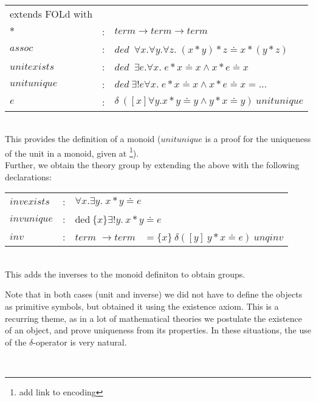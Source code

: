 \documentclass{article}
\begin{document}
\begin{example}\ \\
\begin{tabular}{p{3.3cm}p{0.2cm}p{8cm}}\\
extends FOLd with& &  \\
$\ast$ & : & $term \rightarrow term \rightarrow term $\\
$assoc$ & : & $ded$\ $\forall x. \forall y. \forall z.\; (x\ast y)\ast z\doteq x\ast (y \ast z)$\\
$unitexists$ & : & $ded$\   $\exists e.\forall x.\; e\ast x \doteq x \wedge x\ast e\doteq x$ \\
$unitunique$ & : & $ded\ \exists! e \forall x.\; e\ast x \doteq x \wedge x\ast e\doteq x =  \dots$\\
$e$ & : & $\delta\ ([x]\forall y. x\ast y \doteq y \wedge y\ast x\doteq y)\ unitunique$\\

\end{tabular}\\
This provides the definition of a monoid ($unitunique$ is a proof for the uniqueness of the unit in a monoid, given at \footnote{add link to encoding}).\\

Further, we obtain the theory group by extending the above with the following declarations:\\
\begin{tabular}{ p{3cm}p{0.2cm}p{8cm}} 
$invexists$ & : & $\forall x.\exists y .\; x\ast y \doteq e$ \\
$invunique$ & : &  ded$\ \{x\} \exists! y.\ x\ast y \doteq e$\\
$inv$ & : & $term$ $\rightarrow term$ $\; \; =  \{x\}\  \delta ([y]\ y\ast x\doteq e)\ unqinv$
\end{tabular}\\
This adds the inverses to the monoid definiton to obtain groups.

Note that in both cases (unit and inverse) we did not have to define the objects as primitive symbols, but obtained it using the existence axiom. This is a recurring theme, as in a lot of mathematical theories we postulate the existence of an object, and prove uniqueness from its properties. In these situations, the use of the $\delta$-operator is very natural. 
\end{example}\
\end{document}
